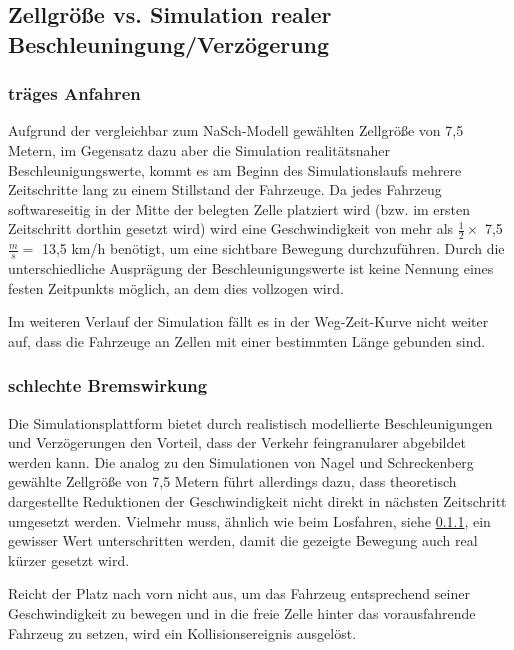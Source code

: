 \subsection{Zellgröße vs. Simulation realer Beschleuningung/Verzögerung}

\subsubsection{träges Anfahren}
\label{sec:accelerategroove}

Aufgrund der vergleichbar zum NaSch-Modell gewählten Zellgröße von 7,5 Metern, im Gegensatz dazu aber die Simulation realitätsnaher Beschleunigungswerte, kommt es am Beginn des Simulationslaufs mehrere Zeitschritte lang zu einem Stillstand der Fahrzeuge.
Da jedes Fahrzeug softwareseitig in der Mitte der belegten Zelle platziert wird (bzw. im ersten Zeitschritt dorthin gesetzt wird) wird eine Geschwindigkeit von mehr als $ \frac{1}{2} \times $ 7,5 $ \frac{m}{s} = $ 13,5 km/h benötigt, um eine sichtbare Bewegung durchzuführen.
Durch die unterschiedliche Ausprägung der Beschleunigungswerte ist keine Nennung eines festen Zeitpunkts möglich, an dem dies vollzogen wird.

Im weiteren Verlauf der Simulation fällt es in der Weg-Zeit-Kurve nicht weiter auf, dass die Fahrzeuge an Zellen mit einer bestimmten Länge gebunden sind.



\subsubsection{schlechte Bremswirkung}
\label{sec:bremsverhalten}

Die Simulationsplattform bietet durch realistisch modellierte Beschleunigungen und Verzögerungen den Vorteil, dass der Verkehr feingranularer abgebildet werden kann.
Die analog zu den Simulationen von Nagel und Schreckenberg gewählte Zellgröße von 7,5 Metern führt allerdings dazu, dass theoretisch dargestellte Reduktionen der Geschwindigkeit nicht direkt in nächsten Zeitschritt umgesetzt werden.
Vielmehr muss, ähnlich wie beim Losfahren, siehe \cref{sec:accelerategroove}, ein gewisser Wert unterschritten werden, damit die gezeigte Bewegung auch real kürzer gesetzt wird.

Reicht der Platz nach vorn nicht aus, um das Fahrzeug entsprechend seiner Geschwindigkeit zu bewegen und in die freie Zelle hinter das vorausfahrende Fahrzeug zu setzen, wird ein Kollisionsereignis ausgelöst.

